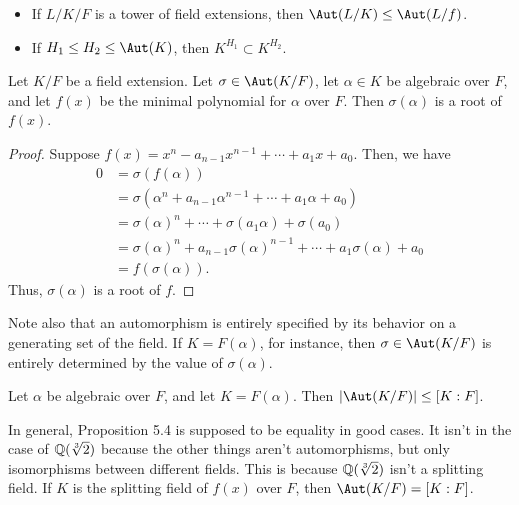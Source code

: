 \documentclass{scrartcl}
\begin{document}
\begin{proposition}
	\begin{itemize}
		\item If $L/K/F$ is a tower of field extensions, then $\Aut(L/K) \le \Aut(L/f)$.
		\item If $H_1 \le H_2 \le \Aut(K)$, then $K^{H_1} \subset K^{H_2}$.
	\end{itemize}
\end{proposition}

\begin{proposition}
	Let $K/F $ be a field extension. Let $\sigma \in \Aut(K/F)$, let $\alpha \in K$ be algebraic over $F$, and let $f(x)$ be the minimal polynomial for $\alpha$ over $F$. Then $\sigma(\alpha)$ is a root of $f(x)$. 
\end{proposition}

\begin{proof}
	Suppose $f(x) = x^n - a_{n-1} x^{n-1} + \cdots + a_1x + a_0$. Then, we have 
	\begin{align*}
		0 &= \sigma(f(\alpha)) \\
		&= \sigma(\alpha^n + a_{n-1}\alpha^{n-1} + \cdots + a_1 \alpha + a_0) \\
		&= \sigma(\alpha)^n + \cdots + \sigma(a_1\alpha) + \sigma(a_0) \\
		&= \sigma(\alpha)^n + a_{n-1} \sigma(\alpha)^{n-1} + \cdots + a_1 \sigma(\alpha) + a_0 \\
		&= f(\sigma(\alpha)).
	\end{align*}
	Thus, $\sigma(\alpha)$ is a root of $f$.
\end{proof}

Note also that an automorphism is entirely specified by its behavior on a generating set of the field. If $K = F(\alpha)$, for instance, then $\sigma \in \Aut(K/F)$ is entirely determined by the value of $\sigma(\alpha)$.

\begin{proposition}
	Let $\alpha$ be algebraic over $F$, and let $K = F(\alpha)$. Then $|\Aut(K/F)| \le [K:F]$.
\end{proposition}

In general, Proposition 5.4 is supposed to be equality in good cases. It isn't in the case of $\mathbb{Q}(\sqrt[3]{2})$ because the other things aren't automorphisms, but only isomorphisms between different fields. This is because $\mathbb{Q}(\sqrt[3]{2})$ isn't a splitting field. If $K$ is the splitting field of $f(x)$ over $F$, then $\Aut(K/F) = [K:F]$.
\end{document}
